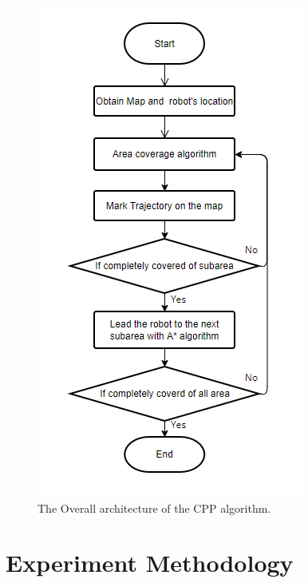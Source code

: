\documentclass[conference]{IEEEtran}
\begin{document}
\begin{figure}[htbp]
\centerline{\includegraphics[scale=0.8]{RS_Report/The Overall architecture of the CPP algorithm.png}}
\caption{The Overall architecture of the CPP algorithm.}
\label{fig3}
\end{figure}

\section{Experiment Methodology}
\end{document}
